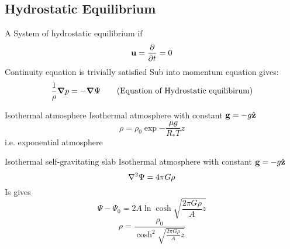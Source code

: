 \documentclass[12pt,a4paper]{article}
\begin{document}
    \subsection{Hydrostatic Equilibrium}
        A System of hydrostatic equilibrium if 
        \begin{equation}
            \vb{u} = \pdv{}{t} =0
        \end{equation}
        Continuity equation is trivially satisfied
        Sub into momentum equation gives:
        \begin{equation}
            \frac{1}{\rho}\grad{p} = - \grad{\Psi}\tag{Equation of Hydrostatic equilibirum}
        \end{equation}
        \begin{example}
            {Isothermal atmosphere}{
                Isothermal atmosphere with constant $\vb{g}=-g\hat{\vb{z}}$
                \begin{equation}
                    \rho = \rho_0 \exp{-\frac{\mu g} {R_{*} T} z}
                \end{equation}
                i.e. exponential atmosphere
            }
        \end{example}
        \begin{example}
            {Isothermal self-gravitating slab}{
                Isothermal atmosphere with constant $\vb{g}=-g\hat{\vb{z}}$
                \begin{equation}
                    \laplacian{\Psi} = 4\pi G\rho
                \end{equation}
                Is gives
                \begin{equation}
                    \Psi-\Psi_0 = 2A\ln{\cosh{\sqrt{\frac{2\pi G\rho}{A}z}}}
                \end{equation}
                \begin{equation}
                    \rho = \frac{\rho_0}{\cosh^2{\sqrt{\frac{2\pi G\rho}{A}z}}}
                \end{equation}
            }
        \end{example}
\end{document}
